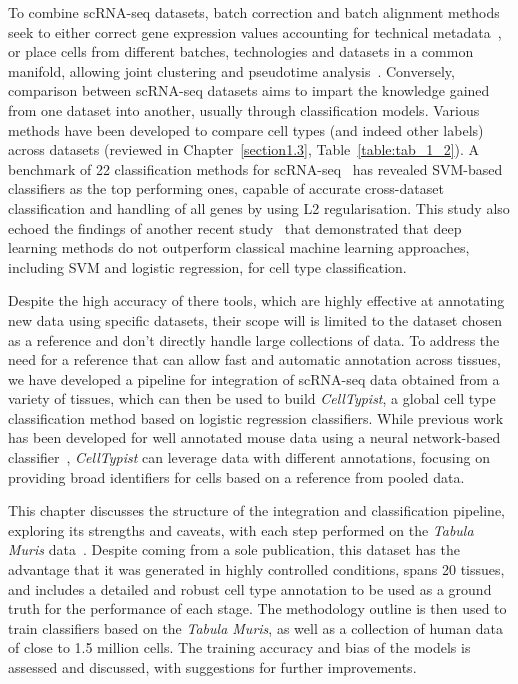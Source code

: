 To combine scRNA-seq datasets, batch correction and batch alignment methods seek to either correct gene expression values accounting for technical metadata~\citep{ritchie_limma_2015,johnson_adjusting_2007,buettner_f-sclvm:_2017,haghverdi_batch_2018,buttner_test_2019}, or place cells from different batches, technologies and datasets in a common manifold, allowing joint clustering and pseudotime analysis~\citep{butler_integrating_2018,polanski_bbknn:_2019,hie_efficient_2019,korsunsky_fast_2018,stuart_comprehensive_2019}. Conversely, comparison between scRNA-seq datasets aims to impart the knowledge gained from one dataset into another, usually through classification models. Various methods have been developed to compare cell types (and indeed other labels) across datasets (reviewed in Chapter~\ref{section1.3}, Table~\ref{table:tab_1_2}). A benchmark of 22 classification methods for scRNA-seq~\citep{abdelaal_comparison_2019} has revealed SVM-based classifiers as the top performing ones, capable of accurate cross-dataset classification and handling of all genes by using L2 regularisation. This study also echoed the findings of another recent study~\citep{kohler_deep_2019} that demonstrated that deep learning methods do not outperform classical machine learning approaches, including SVM and logistic regression, for cell type classification.

Despite the high accuracy of there tools, which are highly effective at annotating new data using specific datasets, their scope will is limited to the dataset chosen as a reference and don't directly handle large collections of data. To address the need for a reference that can allow fast and automatic annotation across tissues, we have developed a pipeline for integration of scRNA-seq data obtained from a variety of tissues, which can then be used to build \textit{CellTypist}, a global cell type classification method based on logistic regression classifiers. While previous work has been developed for well annotated mouse data using a neural network-based classifier~\citep{alavi_web_2018}, \textit{CellTypist} can leverage data with different annotations, focusing on providing broad identifiers for cells based on a reference from pooled data. 

This chapter discusses the structure of the integration and classification pipeline, exploring its strengths and caveats, with each step performed on the \textit{Tabula Muris} data~\citep{noauthor_single-cell_2018}. Despite coming from a sole publication, this dataset has the advantage that it was generated in highly controlled conditions, spans 20 tissues, and includes a detailed and robust cell type annotation to be used as a ground truth for the performance of each stage. The methodology outline is then used to train classifiers based on the \textit{Tabula Muris}, as well as a collection of human data of close to 1.5 million cells. The training accuracy and bias of the models is assessed and discussed, with suggestions for further improvements.

